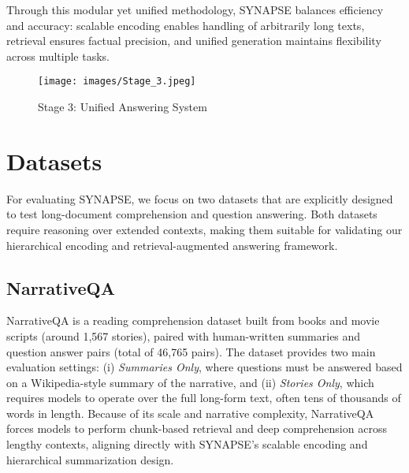 \documentclass[11pt]{article}
\begin{document}
Through this modular yet unified methodology, SYNAPSE balances efficiency and accuracy: scalable encoding enables handling of arbitrarily long texts, retrieval ensures factual precision, and unified generation maintains flexibility across multiple tasks.

\begin{figure}[H]
    \centering
    \texttt{[image: images/Stage\_3.jpeg]}
    \caption*{Stage 3: Unified Answering System}
    \label{fig:stage2}
\end{figure}

\section{Datasets}
For evaluating SYNAPSE, we focus on two datasets that are explicitly designed to test long-document comprehension and question answering. Both datasets require reasoning over extended contexts, making them suitable for validating our hierarchical encoding and retrieval-augmented answering framework.

\subsection{NarrativeQA}
NarrativeQA \citep{kočiský2017narrativeqareadingcomprehensionchallenge} is a reading comprehension dataset built from books and movie scripts (around 1,567 stories), paired with human-written summaries and question answer pairs (total of 46,765 pairs). The dataset provides two main evaluation settings: (i) \textit{Summaries Only}, where questions must be answered based on a Wikipedia-style summary of the narrative, and (ii) \textit{Stories Only}, which requires models to operate over the full long-form text, often tens of thousands of words in length. Because of its scale and narrative complexity, NarrativeQA forces models to perform chunk-based retrieval and deep comprehension across lengthy contexts, aligning directly with SYNAPSE's scalable encoding and hierarchical summarization design.
\end{document}

